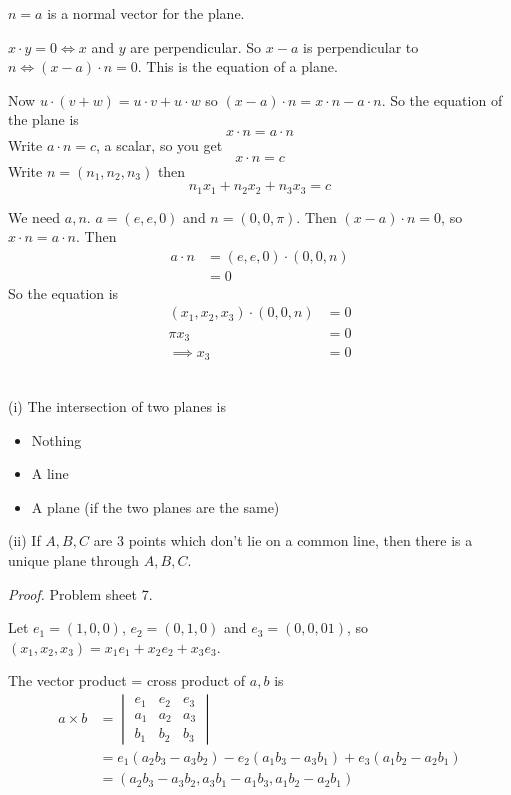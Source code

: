 \documentclass[10pt]{scrartcl}
\begin{document}
$n = a$ is a normal vector for the plane. 

$x\cdot y = 0 \iff x$ and $y$ are perpendicular. So $x-a$ is perpendicular to $n \iff (x-a)\cdot n = 0$. This is the equation of a plane. 

Now $u \cdot (v+w) = u\cdot v + u\cdot w$ so $(x-a) \cdot n = x\cdot n - a\cdot n$. So the equation of the plane is 
\[x\cdot n = a\cdot n\]
Write $a\cdot n = c$, a scalar, so you get
\[x\cdot n = c\]
Write $n = (n_1,n_2,n_3)$ then 
\[
  n_1x_1 + n_2x_2 + n_3x_3 = c
\]

\begin{example}
	We need $a,n$. $a = (e,e,0)$ and $n = (0,0,\pi)$. Then $(x-a) \cdot n = 0$, so $x\cdot n = a\cdot n$. Then 
	\begin{align*}
  a\cdot n &= (e,e,0) \cdot (0,0,n)\\
  &= 0
\end{align*}
So the equation is 
\begin{align*}
  (x_1,x_2,x_3)\cdot(0,0,n) &= 0\\
  \pi x_3 &= 0\\
  \implies x_3 &= 0
\end{align*}
\end{example}\vsp

\begin{proposition}~\\[0.1cm]
(i) The intersection of two planes is 
\begin{itemize}
\item Nothing
\item A line 
\item A plane (if the two planes are the same)
\end{itemize}
(ii) If $A,B,C$ are $3$ points which don't lie on a common line, then there is a unique plane through $A,B,C$.
\end{proposition}
\emph{Proof.} Problem sheet 7.

Let $e_1 = (1,0,0)$, $e_2 = (0,1,0)$ and $e_3 = (0,0,01)$, so $(x_1,x_2,x_3) = x_1e_1 + x_2e_2 + x_3e_3$.\\

\begin{definition}
	The vector product = cross product of $a,b$ is 
\begin{align*}
  a \times b &= \begin{vmatrix}
 e_1 & e_2 & e_3\\
 a_1 & a_2 & a_3\\
 b_1 & b_2 & b_3	
 \end{vmatrix}\\
 &= e_1(a_2b_3 - a_3b_2) - e_2(a_1b_3 - a_3b_1) + e_3(a_1b_2 - a_2b_1)\\
 &= (a_2b_3 - a_3b_2, a_3b_1 - a_1b_3, a_1b_2 - a_2b_1)
\end{align*}

\end{definition}\vspace*{5pt}
\end{document}
